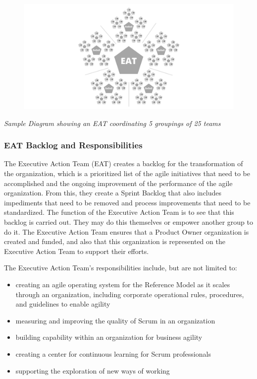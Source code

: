 \documentclass[12pt,a4paper,parskip=full]{scrartcl}
\begin{document}
\begin{figure}
    \centering
    \includegraphics[scale=0.15]{3.png}
    
\end{figure}


\emph{Sample Diagram showing an EAT coordinating 5 groupings of 25
teams}

\subsubsection{EAT Backlog and
Responsibilities}\label{EAT-backlog-and-responsibilities}

The Executive Action Team (EAT) creates a backlog for the transformation
of the organization, which is a prioritized list of the agile
initiatives that need to be accomplished and the ongoing improvement of
the performance of the agile organization. From this, they create a
Sprint Backlog that also includes impediments that need to be removed
and process improvements that need to be standardized. The function of
the Executive Action Team is to see that this backlog is carried out.
They may do this themselves or empower another group to do it. The
Executive Action Team ensures that a Product Owner organization is
created and funded, and also that this organization is represented on
the Executive Action Team to support their efforts.

The Executive Action Team's responsibilities include, but are not
limited to:

\begin{itemize}
\itemsep1pt\parskip0pt
\item
  creating an agile operating system for the Reference Model as it
  scales through an organization, including corporate operational rules,
  procedures, and guidelines to enable agility
\item
  measuring and improving the quality of Scrum in an organization
\item
  building capability within an organization for business agility
\item
  creating a center for continuous learning for Scrum professionals
\item
  supporting the exploration of new ways of working
\end{itemize}
\end{document}
